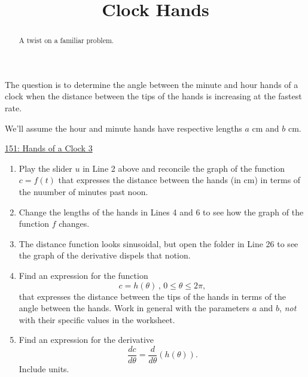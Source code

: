 \documentclass{ximera}
\title{Clock Hands}
\begin{document}
\begin{abstract}
A twist on a familiar problem.
\end{abstract}
\maketitle


\begin{question}
The question is to determine the angle between the minute and hour hands of a clock when the distance between the tips of the hands is increasing at the fastest rate.

We'll assume the hour and minute hands have respective lengths $a$ cm and $b$ cm.


\begin{onlineOnly}
    \begin{center}
\end{center}
\end{onlineOnly}

\href{https://www.desmos.com/calculator/efhex45zkr}{151: Hands of a Clock 3}

\begin{enumerate}

\item Play the slider $u$ in Line 2 above and reconcile the graph of the function $c=f(t)$ that expresses the distance between the hands (in cm) in terms of the nuumber of minutes past noon.

\item Change the lengths of the hands in Lines 4 and 6 to see how the graph of the function $f$ changes.

\item The distance function looks sinusoidal, but open the folder in Line 26 to see the graph of the derivative dispels that notion. 

\item Find an expression for the function 
\[
  c=h(\theta) \, , \, 0\leq \theta \leq 2\pi ,
\]
that expresses the distance between the tips of the hands in terms of the angle between the hands. Work in general with the parameters $a$ and $b$, \emph{not} with their specific values in the worksheet.

\item Find an expression for the derivative
\[
  \frac{dc}{d\theta} = \frac{d}{d\theta}\left( h(\theta) \right) .
\]
Include units.


\end{enumerate}
\end{question}
\end{document}
